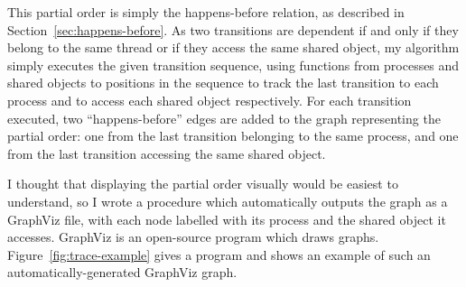 \documentclass[12pt,a4paper,twoside,openright]{report}
\begin{document}
This partial order is simply the happens-before
relation, as described in
Section~\ref{sec:happens-before}. As
two transitions are dependent if and only
if they belong to the same thread or if
they access the same shared object, my
algorithm simply executes the given transition
sequence, using functions from processes
and shared objects to positions in
the sequence to track the last
transition to each process and
to access each shared object respectively.
For each
transition executed, two ``happens-before''
edges are added
to the graph representing the partial
order: one from the last transition
belonging to the same process, and one
from the last transition accessing the
same shared object.

I thought that displaying the partial
order visually would be easiest to
understand, so I wrote a procedure which
automatically outputs the graph as
a GraphViz file, with each node
labelled with its process and the
shared object it accesses.
GraphViz is an open-source program which
draws graphs.
Figure~\ref{fig:trace-example} gives a program
and shows an example of such an
automatically-generated GraphViz graph.
\end{document}
